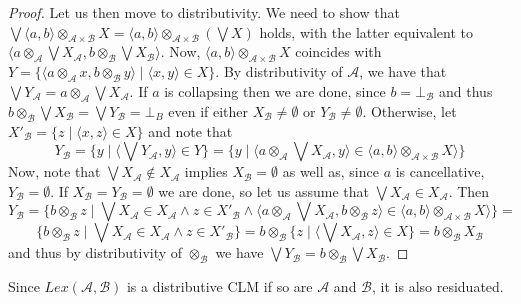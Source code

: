 \documentclass[a4paper]{elsarticle}
\newcommand{\1}{\mathbf{1}}
\begin{document}
\begin{proof}
	Let us then move to distributivity. We need to show that
	$\bigvee \langle a, b\rangle \otimes_{\mathcal{A} \times \mathcal{B}} X = \langle a, b\rangle \otimes_{\mathcal{A} \times \mathcal{B}}  (\bigvee X)$ holds,
	with the latter equivalent to $\langle a \otimes_\mathcal{A} \bigvee X_\mathcal{A}, b \otimes_\mathcal{B} \bigvee X_\mathcal{B} \rangle$.
	Now, $\langle a, b\rangle \otimes_{\mathcal{A} \times \mathcal{B}} X$ coincides with 
	$Y = \{\langle a \otimes_\mathcal{A}  x,  b \otimes_\mathcal{B}  y \rangle \mid \langle x, y \rangle \in X\}$.
	By distributivity of $\mathcal{A}$, we have that $\bigvee Y_\mathcal{A} = a \otimes_\mathcal{A} \bigvee X_\mathcal{A}$.
	If $a$ is collapsing then we are done, since $b = \bot_\mathcal{B}$ and thus $b \otimes_\mathcal{B} \bigvee X_\mathcal{B} = 
	\bigvee Y_\mathcal{B} = \bot_{B}$
	even if either $X_\mathcal{B} \neq \emptyset$ or $Y_\mathcal{B} \neq \emptyset$. Otherwise, 
	let 
	$X'_\mathcal{B} = \{ z \mid \langle x, z\rangle \in X \}$ and note that 
	$$Y_\mathcal{B} = \{ y \mid \langle \bigvee Y_\mathcal{A}, y \rangle \in Y\}
	= \{ y \mid \langle a \otimes_\mathcal{A} \bigvee X_\mathcal{A}, y \rangle \in \langle a, b\rangle \otimes_{\mathcal{A} \times \mathcal{B}} X \rangle \}$$
	\noindent
	Now, note that $\bigvee X_\mathcal{A} \not \in X_\mathcal{A}$ implies $X_\mathcal{B} = \emptyset$ as well as, since $a$ is cancellative, $Y_\mathcal{B} = \emptyset$.
	If $X_\mathcal{B} = Y_\mathcal{B} = \emptyset$ we are done, so let us assume that $\bigvee X_\mathcal{A} \in X_\mathcal{A}$. Then
	$$Y_\mathcal{B} = \{ b \otimes_\mathcal{B}   z \mid \bigvee X_\mathcal{A} \in X_\mathcal{A} \wedge z \in X'_\mathcal{B} \wedge 
	      \langle a \otimes_\mathcal{A} \bigvee X_\mathcal{A}, b  \otimes_\mathcal{B} z \rangle \in \langle a, b\rangle \otimes_{\mathcal{A} \times \mathcal{B}} X \rangle \} =$$
	$$\{ b \otimes_\mathcal{B} z \mid  \bigvee X_\mathcal{A} \in X_\mathcal{A}  \wedge z \in X'_\mathcal{B}\} =
	    b \otimes_\mathcal{B} \{ z \mid \langle \bigvee X_\mathcal{A}, z \rangle \in X \} = b \otimes_\mathcal{B} X_\mathcal{B}$$
	\noindent
	and thus by distributivity of $\otimes_\mathcal{B}$ we have $\bigvee Y_\mathcal{B} = b \otimes_\mathcal{B} \bigvee X_\mathcal{B}$.
\end{proof}

Since $Lex(\mathcal{A},\mathcal{B})$ is a distributive CLM if so are $\mathcal{A}$ and $\mathcal{B}$, it is also residuated.
\end{document}
